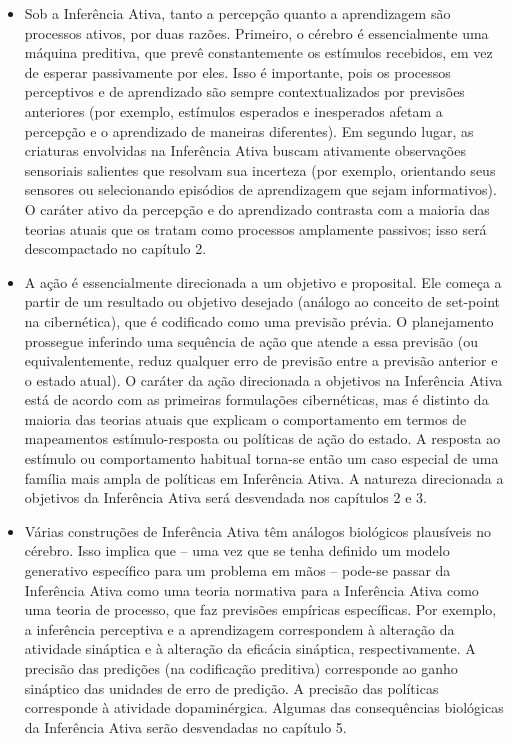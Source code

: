 \documentclass[
  12pt,
]{book}
\begin{document}
\begin{itemize}
\item
  Sob a Inferência Ativa, tanto a percepção quanto a aprendizagem são processos ativos, por duas razões. Primeiro, o cérebro é essencialmente uma máquina preditiva, que prevê constantemente os estímulos recebidos, em vez de esperar passivamente por eles. Isso é importante, pois os processos perceptivos e de aprendizado são sempre contextualizados por previsões anteriores (por exemplo, estímulos esperados e inesperados afetam a percepção e o aprendizado de maneiras diferentes). Em segundo lugar, as criaturas envolvidas na Inferência Ativa buscam ativamente observações sensoriais salientes que resolvam sua incerteza (por exemplo, orientando seus sensores ou selecionando episódios de aprendizagem que sejam informativos). O caráter ativo da percepção e do aprendizado contrasta com a maioria das teorias atuais que os tratam como processos amplamente passivos; isso será descompactado no capítulo 2.
\item
  A ação é essencialmente direcionada a um objetivo e proposital. Ele começa a partir de um resultado ou objetivo desejado (análogo ao conceito de set-point na cibernética), que é codificado como uma previsão prévia. O planejamento prossegue inferindo uma sequência de ação que atende a essa previsão (ou equivalentemente, reduz qualquer erro de previsão entre a previsão anterior e o estado atual). O caráter da ação direcionada a objetivos na Inferência Ativa está de acordo com as primeiras formulações cibernéticas, mas é distinto da maioria das teorias atuais que explicam o comportamento em termos de mapeamentos estímulo-resposta ou políticas de ação do estado. A resposta ao estímulo ou comportamento habitual torna-se então um caso especial de uma família mais ampla de políticas em Inferência Ativa. A natureza direcionada a objetivos da Inferência Ativa será desvendada nos capítulos 2 e 3.
\item
  Várias construções de Inferência Ativa têm análogos biológicos plausíveis no cérebro. Isso implica que -- uma vez que se tenha definido um modelo generativo específico para um problema em mãos -- pode-se passar da Inferência Ativa como uma teoria normativa para a Inferência Ativa como uma teoria de processo, que faz previsões empíricas específicas. Por exemplo, a inferência perceptiva e a aprendizagem correspondem à alteração da atividade sináptica e à alteração da eficácia sináptica, respectivamente. A precisão das predições (na codificação preditiva) corresponde ao ganho sináptico das unidades de erro de predição. A precisão das políticas corresponde à atividade dopaminérgica. Algumas das consequências biológicas da Inferência Ativa serão desvendadas no capítulo 5.
\end{itemize}
\end{document}
